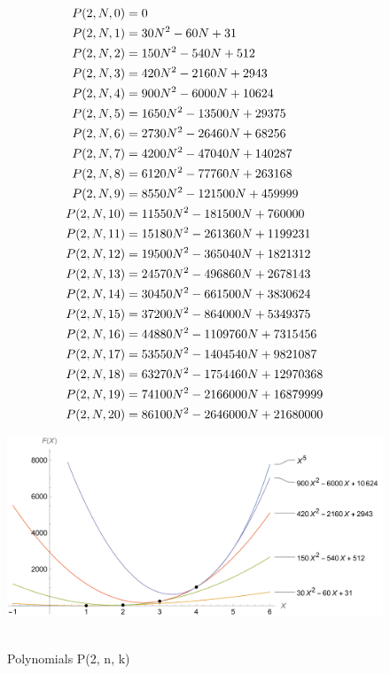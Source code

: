 ﻿\begin{align*}
    {P}(2,N,0) &= 0 \\
    {P}(2,N,1) &= 30N^2 - 60N + 31 \\
    {P}(2,N,2) &= 150N^2 - 540N + 512 \\
    {P}(2,N,3) &= 420N^2 - 2160N + 2943 \\
    {P}(2,N,4) &= 900N^2 - 6000N + 10624 \\
    {P}(2,N,5) &= 1650N^2 - 13500N + 29375 \\
    {P}(2,N,6) &= 2730N^2 - 26460N + 68256 \\
    {P}(2,N,7) &= 4200N^2 - 47040N + 140287 \\
    {P}(2,N,8) &= 6120N^2 - 77760N + 263168 \\
    {P}(2,N,9) &= 8550N^2 - 121500N + 459999 \\
    {P}(2,N,10) &= 11550N^2 - 181500N + 760000 \\
    {P}(2,N,11) &= 15180N^2 - 261360N + 1199231 \\
    {P}(2,N,12) &= 19500N^2 - 365040N + 1821312 \\
    {P}(2,N,13) &= 24570N^2 - 496860N + 2678143 \\
    {P}(2,N,14) &= 30450N^2 - 661500N + 3830624 \\
    {P}(2,N,15) &= 37200N^2 - 864000N + 5349375 \\
    {P}(2,N,16) &= 44880N^2 - 1109760N + 7315456 \\
    {P}(2,N,17) &= 53550N^2 - 1404540N + 9821087 \\
    {P}(2,N,18) &= 63270N^2 - 1754460N + 12970368 \\
    {P}(2,N,19) &= 74100N^2 - 2166000N + 16879999 \\
    {P}(2,N,20) &= 86100N^2 - 2646000N + 21680000
\end{align*}
\begin{figure}[H]
    \centering
    \includegraphics[width=1\textwidth]{sections/images/03_fifth_power_with_p_1_n_k}
    ~\caption{Polynomials P(2, n, k)}\label{fig:figure3}
\end{figure}
